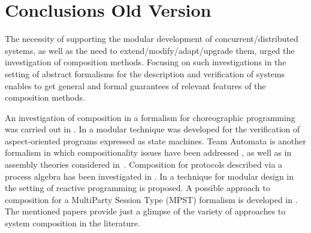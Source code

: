 



\section{Conclusions Old Version}
\label{sect:conclusions}

The necessity of supporting the modular development of concurrent/distributed systems,
as well as the need to extend/modify/adapt/upgrade them, urged the investigation
 of composition methods. Focusing on such investigations in the setting of abstract formalisms
for the description and verification of systems enables to get general and formal guarantees of relevant features
of the composition methods. 

An investigation of composition in a formalism for choreographic programming was carried out in \cite{MY13}. 
In \cite{KFG04} a modular technique was developed for the verification of 
aspect-oriented programs expressed as state machines.
Team Automata is another formalism in which compositionality issues have been addressed
\cite{BK03,BHK-ictac20},
as well as in assembly theories considered in~\cite{HK-acta15}. 
Composition for protocols described via a process algebra has been investigated in \cite{BOV23}.
In \cite{CMV18,SGV20} a technique for modular design in the setting of reactive programming
is proposed. A possible approach to composition for a MultiParty Session Type (MPST) formalism
is developed in \cite{SMG23}. 
The mentioned papers provide just a glimpse of the variety of approaches to system composition in the literature.




